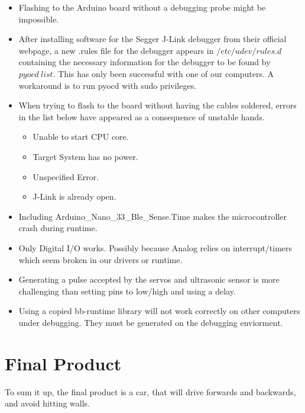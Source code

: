\documentclass{article}
\begin{document}
\begin{itemize}
	\item Flashing to the Arduino board without a debugging probe might be impossible.

	\item After installing software for the Segger J-Link debugger from their official webpage, a new .rules file for the debugger appears in $/etc/udev/rules.d$ containing the necessary information for the debugger to be found by $pyocd\ list$. This has only been successful with one of our computers. A workaround is to run pyocd with sudo privileges.

	\item When trying to flash to the board without having the cables soldered, errors in the list below have appeared as a consequence of unstable hands.
		\begin{itemize}
			\item Unable to start CPU core.
			\item Target System has no power.
            \item Unspecified Error.
            \item J-Link is already open.
		\end{itemize}

	\item Including Arduino\_Nano\_33\_Ble\_Sense.Time makes the microcontroller crash during runtime.

	\item Only Digital I/O works. Possibly because Analog relies on interrupt/timers which seem broken in our drivers or runtime.

	\item Generating a pulse accepted by the servos and ultrasonic sensor is more challenging than setting pins to low/high and using a delay.

	\item Using a copied bb-runtime library will not work correctly on other computers under debugging. They must be generated on the debugging enviorment.

\end{itemize}

\section{Final Product}
To sum it up, the final product is a car, that will drive forwards and backwards, and avoid hitting walls.
\end{document}
